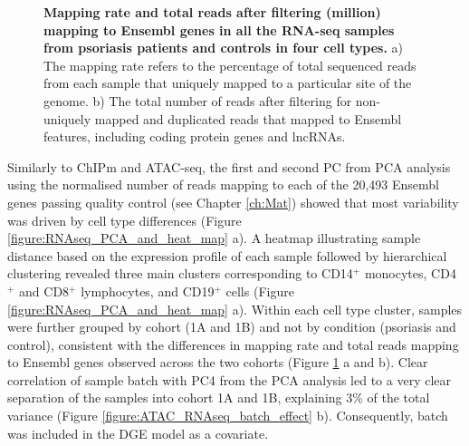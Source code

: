 \begin{figure}[htbp]
\caption[Mapping rate and total reads after filtering (million) mapping to Ensembl genes in all the RNA-seq samples from psoriasis patients and controls in four cell types.]{\textbf{Mapping rate and total reads after filtering (million) mapping to Ensembl genes in all the RNA-seq samples from psoriasis patients and controls in four cell types.} a) The mapping rate refers to the percentage of total sequenced reads from each sample that uniquely mapped to a particular site of the genome. b) The total number of reads after filtering for non-uniquely mapped and duplicated reads that mapped to Ensembl features, including coding protein genes and lncRNAs.}
\label{figure:RNAseq_mapping_rate_and_reads_in_genes}
\end{figure} 


Similarly to ChIPm and ATAC-seq, the first and second PC from PCA analysis using the normalised number of reads mapping to each of the 20,493 Ensembl genes passing quality control (see Chapter \ref{ch:Mat}) showed that most variability was driven by cell type differences (Figure \ref{figure:RNAseq_PCA_and_heat_map} a). A heatmap illustrating sample distance based on the expression profile of each sample followed by hierarchical clustering revealed three main clusters corresponding to CD14$^+$ monocytes, CD4$^+$ and CD8$^+$ lymphocytes, and CD19$^+$ cells (Figure \ref{figure:RNAseq_PCA_and_heat_map} a). Within each cell type cluster, samples were further grouped by cohort (1A and 1B) and not by condition (psoriasis and control), consistent with the differences in mapping rate and total reads mapping to Ensembl genes observed across the two cohorts (Figure \ref{figure:RNAseq_mapping_rate_and_reads_in_genes} a and b). Clear correlation of sample batch with PC4 from the PCA analysis led to a very clear separation of the samples into cohort 1A and 1B, explaining 3\% of the total variance (Figure \ref{figure:ATAC_RNAseq_batch_effect} b). Consequently, batch was included in the DGE model as a covariate.  

